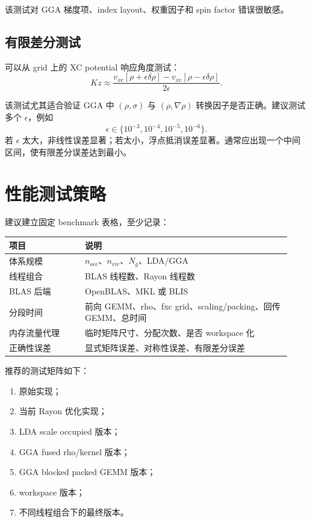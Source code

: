 \documentclass[11pt,a4paper]{ctexart}
\begin{document}
该测试对 GGA 梯度项、index layout、权重因子和 spin factor 错误很敏感。

\subsection{有限差分测试}

可以从 grid 上的 XC potential 响应角度测试：
\begin{equation}
  Kz \approx \frac{v_{xc}[\rho+\epsilon\delta\rho] - v_{xc}[\rho-\epsilon\delta\rho]}{2\epsilon}.
\end{equation}

该测试尤其适合验证 GGA 中 $(\rho,\sigma)$ 与 $(\rho,\nabla\rho)$ 转换因子是否正确。建议测试多个 $\epsilon$，例如
\begin{equation}
  \epsilon\in\{10^{-3},10^{-4},10^{-5},10^{-6}
  \}.
\end{equation}
若 $\epsilon$ 太大，非线性误差显著；若太小，浮点抵消误差显著。通常应出现一个中间区间，使有限差分误差达到最小。

\section{性能测试策略}

建议建立固定 benchmark 表格，至少记录：

\begin{longtable}{>{\raggedright\arraybackslash}p{0.25\linewidth} >{\raggedright\arraybackslash}p{0.68\linewidth}}
\toprule
项目 & 说明 \\
\midrule
体系规模 & $n_{occ}$、$n_{vir}$、$N_g$、LDA/GGA \\
线程组合 & BLAS 线程数、Rayon 线程数 \\
BLAS 后端 & OpenBLAS、MKL 或 BLIS \\
分段时间 & 前向 GEMM、rho、fxc grid、scaling/packing、回传 GEMM、总时间 \\
内存流量代理 & 临时矩阵尺寸、分配次数、是否 workspace 化 \\
正确性误差 & 显式矩阵误差、对称性误差、有限差分误差 \\
\bottomrule
\end{longtable}

推荐的测试矩阵如下：

\begin{enumerate}[leftmargin=2em]
  \item 原始实现；
  \item 当前 Rayon 优化实现；
  \item LDA scale occupied 版本；
  \item GGA fused rho/kernel 版本；
  \item GGA blocked packed GEMM 版本；
  \item workspace 版本；
  \item 不同线程组合下的最终版本。
\end{enumerate}
\end{document}
